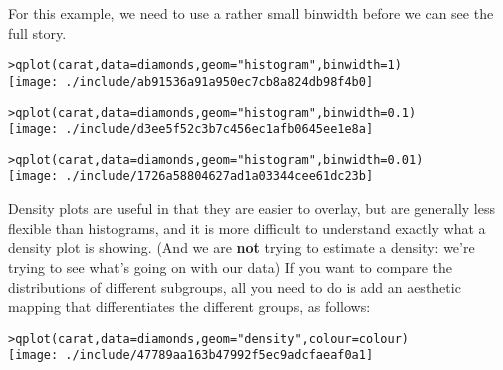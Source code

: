 For this example, we need to use a rather small binwidth before we can see the full story.

\begin{alltt}
> qplot(carat, data = diamonds, geom = "histogram", binwidth = 1)
\texttt{[image: ./include/ab91536a91a950ec7cb8a824db98f4b0]}

> qplot(carat, data = diamonds, geom = "histogram", binwidth = 0.1)
\texttt{[image: ./include/d3ee5f52c3b7c456ec1afb0645ee1e8a]}

> qplot(carat, data = diamonds, geom = "histogram", binwidth = 0.01)
\texttt{[image: ./include/1726a58804627ad1a03344cee61dc23b]}

\end{alltt}

Density plots are useful in that they are easier to overlay, but are generally less flexible than histograms, and it is more difficult to understand exactly what a density plot is showing.  (And we are {\bf not} trying to estimate a density: we're trying to see what's going on with our data)  If you want to compare the distributions of different subgroups, all you need to do is add an aesthetic mapping that differentiates the different groups, as follows:

\begin{alltt}
> qplot(carat, data = diamonds, geom = "density", colour = colour)
\texttt{[image: ./include/47789aa163b47992f5ec9adcfaeaf0a1]}

\end{alltt}

